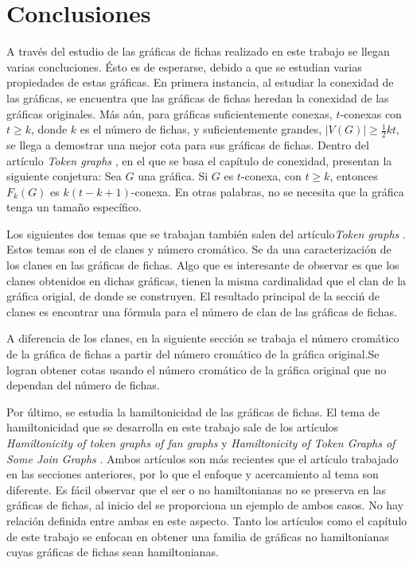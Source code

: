 \chapter{Conclusiones}
\label{sec:conclusiones}


A trav\'es del estudio de las gr\'aficas de fichas realizado en este trabajo se
llegan varias concluciones. \'Esto es de esperarse, debido a que se estudian
varias propiedades de estas gr\'aficas. En primera instancia, al estudiar la
conexidad de las gr\'aficas, se encuentra que las gr\'aficas de fichas heredan
la conexidad de las gr\'aficas originales. M\'as a\'un, para gr\'aficas
suficientemente conexas, $t$-conexas con $t \geq k$, donde $k$ es el n\'umero de
fichas, y suficientemente grandes, $|V(G)| \geq \frac{1}{2}kt$, se llega a
demostrar una mejor cota para sus gr\'aficas de fichas. Dentro del art\'iculo
\textit{Token graphs} \cite{fabilaToken}, en el que se basa el cap\'itulo de
conexidad, presentan la siguiente conjetura: Sea $G$ una gr\'afica. Si $G$ es
$t$-conexa, con $t \geq k$, entonces $F_k(G)$ es $k(t-k+1)$-conexa. En otras
palabras, no se necesita que la gr\'afica tenga un tama\~{n}o espec\'ifico.


Los siguientes dos temas que se trabajan tambi\'en salen del
art\'iculo\textit{Token graphs} \cite{fabilaToken}. Estos temas son el de clanes
y n\'umero crom\'atico. Se da una caracterizaci\'on de los clanes en las
gr\'aficas de fichas. Algo que es interesante de observar es que los clanes
obtenidos en dichas gr\'aficas, tienen la misma cardinalidad que el clan de la
gr\'afica origial, de donde se construyen. El resultado principal de la secci\'n
de clanes es encontrar una f\'ormula para el n\'umero de clan de las gr\'aficas
de fichas.

A diferencia de los clanes, en la siguiente secci\'on se trabaja el n\'umero
crom\'atico de la gr\'afica de fichas a partir del n\'umero crom\'atico de la
gr\'afica original.Se logran obtener cotas usando el n\'umero crom\'atico de la
gr\'afica original que no dependan del n\'umero de fichas. 

Por \'ultimo, se estudia la hamiltonicidad de las gr\'aficas de fichas. El tema
de hamiltonicidad que se desarrolla en este trabajo sale de los art\'iculos
\textit{Hamiltonicity of token graphs of fan graphs} \cite{riveraHamilt} y
\textit{Hamiltonicity of Token Graphs of Some Join Graphs} \cite{adameHamilt}.
Ambos art\'iculos son m\'as recientes que el art\'iculo trabajado en las
secciones anteriores, por lo que el enfoque y acercamiento al tema son
diferente. Es f\'acil observar que el ser o no hamiltonianas no se preserva en
las gr\'aficas de fichas, al inicio del  se proporciona un
ejemplo de ambos casos. No hay relaci\'on definida entre ambas en este aspecto.
Tanto los art\'iculos como el cap\'itulo de este trabajo se enfocan en obtener
una familia de gr\'aficas no hamiltonianas cuyas gr\'aficas de fichas sean
hamiltonianas. 

